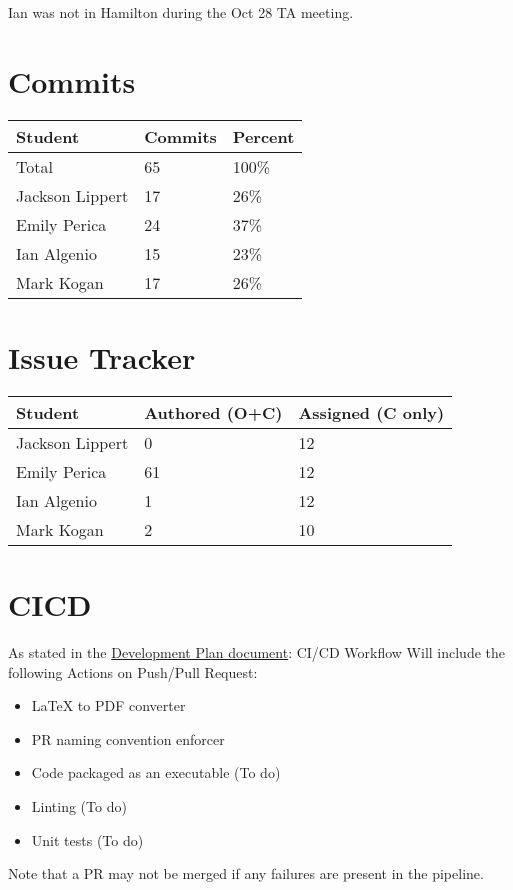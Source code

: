 \documentclass{article}
\begin{document}
Ian was not in Hamilton during the Oct 28 TA meeting.

\section{Commits}

\begin{table}[H]
\centering
\begin{tabular}{lll}
\toprule
\textbf{Student} & \textbf{Commits} & \textbf{Percent}\\
\midrule
Total & 65 & 100\% \\
Jackson Lippert & 17 & 26\% \\
Emily Perica & 24 & 37\% \\
Ian Algenio & 15 & 23\% \\
Mark Kogan & 17 & 26\% \\
\bottomrule
\end{tabular}
\end{table}

\section{Issue Tracker}

\begin{table}[H]
\centering
\begin{tabular}{lll}
\toprule
\textbf{Student} & \textbf{Authored (O+C)} & \textbf{Assigned (C only)}\\
\midrule
Jackson Lippert & 0 & 12\\
Emily Perica & 61 & 12\\
Ian Algenio & 1 & 12\\
Mark Kogan & 2 &10\\
\bottomrule
\end{tabular}
\end{table}

\section{CICD}

As stated in the \href{https://github.com/emilyperica/ScoreGen/blob/main/docs/DevelopmentPlan/DevelopmentPlan.pdf}{Development Plan document}:
CI/CD Workflow Will include the following
Actions on Push/Pull Request:
\begin{itemize}
    \item LaTeX to PDF converter
    \item PR naming convention enforcer
    \item Code packaged as an executable (To do)
    \item Linting (To do)
    \item Unit tests (To do)
\end{itemize}

Note that a PR may not be merged if any failures are present in the pipeline.
\end{document}
